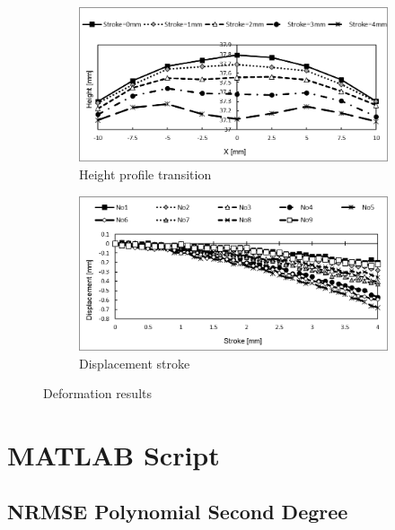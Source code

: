 \begin{figure}
    \centering
    \begin{subfigure}[b]{0.5\textwidth}
    \centering
    \includegraphics[width=\textwidth]{Images/appendix/ynu/fig7hightprofiletransition.png}
    \caption{Height profile transition}
    \label{fig:heighttrans}
    \end{subfigure}
    \hfill
    \begin{subfigure}[b]{0.5\textwidth}
    \centering
    \includegraphics[width=\textwidth]{Images/appendix/ynu/fig8displacementsstroke.png}
    \caption{Displacement stroke}
    \label{fig:disstroke}
    \end{subfigure}
    \vspace{0.5cm}
    \caption{Deformation results}
    \label{fig:defmeasurementynu}
\end{figure}

\section{MATLAB Script}
\subsection*{NRMSE Polynomial Second Degree}

